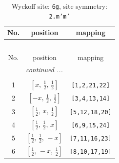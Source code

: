 \documentclass[fleqn,8pt]{jsarticle}
\begin{document}
\renewcommand{\arraystretch}{1.2}
\begin{longtable}{ccc}
\caption{Wyckoff site: {\tt 6g}, site symmetry: {\tt 2.m'm'}}
 \\
 \hline \hline
No. & position & mapping \\ \hline \endfirsthead

\multicolumn{2}{l}{\tablename\ \thetable{}} \\
 \hline \hline
No. & position & mapping \\ \hline \endhead

 \hline \hline
\multicolumn{2}{r}{\footnotesize\it continued ...} \\ \endfoot

 \hline \hline
\multicolumn{2}{r}{} \\ \endlastfoot

1 & $\left[ x,\, \frac{1}{2},\, \frac{1}{2} \right]$ & {\tt [1,2,21,22]} \\ \hline
2 & $\left[ - x,\, \frac{1}{2},\, \frac{1}{2} \right]$ & {\tt [3,4,13,14]} \\ \hline
3 & $\left[ \frac{1}{2},\, x,\, \frac{1}{2} \right]$ & {\tt [5,12,18,20]} \\ \hline
4 & $\left[ \frac{1}{2},\, \frac{1}{2},\, x \right]$ & {\tt [6,9,15,24]} \\ \hline
5 & $\left[ \frac{1}{2},\, \frac{1}{2},\, - x \right]$ & {\tt [7,11,16,23]} \\ \hline
6 & $\left[ \frac{1}{2},\, - x,\, \frac{1}{2} \right]$ & {\tt [8,10,17,19]} \\
\end{longtable}
\renewcommand{\arraystretch}{1.2}
\end{document}
